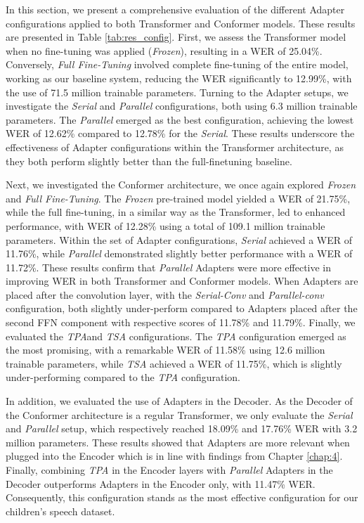 In this section, we present a comprehensive evaluation of the different Adapter configurations applied to both Transformer and Conformer models. These results are presented in Table \ref{tab:res_config}. First, we assess the Transformer model when no fine-tuning was applied (\textit{Frozen}), resulting in a \ac{WER} of 25.04\%. Conversely, \textit{Full Fine-Tuning} involved complete fine-tuning of the entire model, working as our baseline system, reducing the \ac{WER} significantly to 12.99\%, with the use of 71.5 million trainable parameters.
Turning to the Adapter setups, we investigate the \textit{Serial} and \textit{Parallel} configurations, both using 6.3 million trainable parameters. The \textit{Parallel} emerged as the best configuration, achieving the lowest \ac{WER} of 12.62\% compared to 12.78\% for the \textit{Serial}. These results underscore the effectiveness of Adapter configurations within the Transformer architecture, as they both perform slightly better than the full-finetuning baseline.

Next, we investigated the Conformer architecture, we once again explored \textit{Frozen} and \textit{Full Fine-Tuning}. The \textit{Frozen} pre-trained model yielded a \ac{WER} of 21.75\%, while the full fine-tuning, in a similar way as the Transformer, led to enhanced performance, with \ac{WER} of 12.28\% using a total of 109.1 million trainable parameters. Within the set of Adapter configurations, \textit{Serial} achieved a \ac{WER} of 11.76\%, while \textit{Parallel} demonstrated slightly better performance with a \ac{WER} of 11.72\%. These results confirm that \textit{Parallel} Adapters were more effective in improving \ac{WER} in both Transformer and Conformer models. When Adapters are placed after the convolution layer, with the \textit{Serial-Conv} and \textit{Parallel-conv} configuration, both slightly under-perform compared to Adapters placed after the second \ac{FFN} component with respective scores of 11.78\% and 11.79\%. Finally, we evaluated the \textit{\ac{TPA}}and \textit{\ac{TSA}} configurations. The \textit{\ac{TPA}} configuration emerged as the most promising, with a remarkable \ac{WER} of 11.58\% using 12.6 million trainable parameters, while \textit{\ac{TSA}} achieved a \ac{WER} of 11.75\%, which is slightly under-performing compared to the \textit{\ac{TPA}} configuration.

In addition, we evaluated the use of Adapters in the Decoder. As the Decoder of the Conformer architecture is a regular Transformer, we only evaluate the \textit{Serial} and \textit{Parallel} setup, which respectively reached 18.09\%  and 17.76\% \ac{WER} with 3.2 million parameters. These results showed that Adapters are more relevant when plugged into the Encoder which is in line with findings from Chapter \ref{chap:4}. Finally, combining \textit{\ac{TPA}} in the Encoder layers with \textit{Parallel} Adapters in the Decoder outperforms Adapters in the Encoder only, with 11.47\% \ac{WER}. Consequently, this configuration stands as the most effective configuration for our children's speech dataset. 

